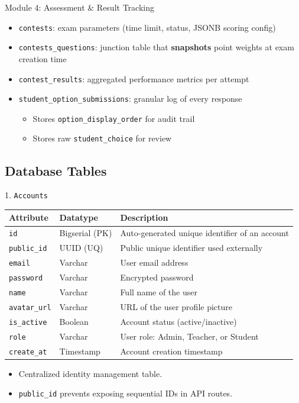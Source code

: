 \documentclass[aspectratio=169, 10pt]{beamer}
\begin{document}
\begin{frame}{Module 4: Assessment \& Result Tracking}
    \begin{itemize}
        \item \texttt{contests}: exam parameters (time limit, status, JSONB scoring config)
        \item \texttt{contests\_questions}: junction table that \textbf{snapshots} point weights at exam creation time
        \item \texttt{contest\_results}: aggregated performance metrics per attempt
        \item \texttt{student\_option\_submissions}: granular log of every response
        \begin{itemize}
            \item Stores \texttt{option\_display\_order} for audit trail
            \item Stores raw \texttt{student\_choice} for review
        \end{itemize}
    \end{itemize}
\end{frame}


\subsection{Database Tables}

\begin{frame}{1. \texttt{Accounts}}
    \centering
    \footnotesize
    \begin{tabular}{|l|l|p{8cm}|}
        \hline
        \textbf{Attribute} & \textbf{Datatype} & \textbf{Description} \\ \hline
        \texttt{id} & Bigserial (PK) & Auto-generated unique identifier of an account\\ \hline
        \texttt{public\_id} & UUID (UQ) & Public unique identifier used externally\\ \hline
        \texttt{email} & Varchar & User email address\\ \hline
        \texttt{password} & Varchar & Encrypted password\\ \hline
        \texttt{name} & Varchar & Full name of the user\\ \hline
        \texttt{avatar\_url} & Varchar & URL of the user profile picture\\ \hline
        \texttt{is\_active} & Boolean & Account status (active/inactive)\\ \hline
        \texttt{role} & Varchar & User role: Admin, Teacher, or Student\\ \hline
        \texttt{create\_at} & Timestamp & Account creation timestamp\\ \hline
    \end{tabular}
    \vspace{0.2cm}
    \begin{itemize}
        \item Centralized identity management table.
        \item \texttt{public\_id} prevents exposing sequential IDs in API routes.
    \end{itemize}
\end{frame}
\end{document}
